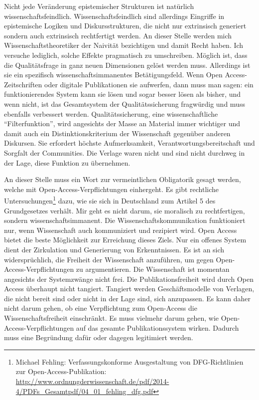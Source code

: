 \documentclass[a4paper,
fontsize=11pt,
oneside,
numbers=noperiodatend,
parskip=half-,
bibliography=totoc,
final
]{scrartcl}
\begin{document}
Nicht jede Veränderung epistemischer Strukturen ist natürlich
wissenschaftsfeindlich. Wissenschaftsfeindlich sind allerdings Eingriffe
in epistemische Logiken und Diskursstrukturen, die nicht nur extrinsisch
generiert sondern auch extrinsisch rechtfertigt werden. An dieser Stelle
werden mich Wissenschaftstheoretiker der Naivität bezichtigen und damit
Recht haben. Ich versuche lediglich, solche Effekte pragmatisch zu
umschreiben. Möglich ist, dass die Qualitätsfrage in ganz neuen
Dimensionen gelöst werden muss. Allerdings ist sie ein spezifisch
wissenschaftsimmanentes Betätigungsfeld. Wenn Open Access-Zeitschriften
oder digitale Publikationen sie aufwerfen, dann muss man sagen: ein
funktionierendes System kann sie lösen und sogar besser lösen als
bisher, und wenn nicht, ist das Gesamtsystem der Qualitätssicherung
fragwürdig und muss ebenfalls verbessert werden. Qualitätssicherung,
eine wissenschaftliche \enquote{Filterfunktion}, wird angesichts der
Masse an Material immer wichtiger und damit auch ein
Distinktionskriterium der Wissenschaft gegenüber anderen Diskursen. Sie
erfordert höchste Aufmerksamkeit, Verantwortungsbereitschaft und
Sorgfalt der Communities. Die Verlage waren nicht und sind nicht
durchweg in der Lage, diese Funktion zu übernehmen.

An dieser Stelle muss ein Wort zur vermeintlichen Obligatorik gesagt
werden, welche mit Open-Access-Verpflichtungen einhergeht. Es gibt
rechtliche Untersuchungen\footnote{Michael Fehling: Verfassungskonforme
  Ausgestaltung von DFG-Richtlinien zur Open-Access-Publikation:
  \url{http://www.ordnungderwissenschaft.de/pdf/2014-4/PDFs_Gesamtpdf/04_01_fehling_dfg.pdf}}
dazu, wie sie sich in Deutschland zum Artikel 5 des Grundgesetzes
verhält. Mir geht es nicht darum, sie moralisch zu rechtfertigen,
sondern wissenschaftsimmanent. Die Wissenschaftskommunikation
funktioniert nur, wenn Wissenschaft auch kommuniziert und rezipiert
wird. Open Access bietet die beste Möglichkeit zur Erreichung dieses
Ziels. Nur ein offenes System dient der Zirkulation und Generierung von
Erkenntnissen. Es ist an sich widersprüchlich, die Freiheit der
Wissenschaft anzuführen, um gegen Open-Access-Verpflichtungen zu
argumentieren. Die Wissenschaft ist momentan angesichts der Systemzwänge
nicht frei. Die Publikationsfreiheit wird durch Open Access überhaupt
nicht tangiert. Tangiert werden Geschäftsmodelle von Verlagen, die nicht
bereit sind oder nicht in der Lage sind, sich anzupassen. Es kann daher
nicht darum gehen, ob eine Verpflichtung zum Open-Access die
Wissenschaftsfreiheit einschränkt. Es muss vielmehr darum gehen, wie
Open-Access-Verpflichtungen auf das gesamte Publikationssystem wirken.
Dadurch muss eine Begründung dafür oder dagegen legitimiert werden.
\end{document}
